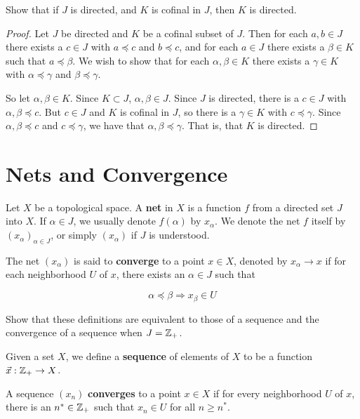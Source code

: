 \documentclass[12pt]{article}
\begin{document}
Show that if $J$ is directed, and $K$ is cofinal in $J$, then $K$ is directed.

\begin{proof}
    Let $J$ be directed and $K$ be a cofinal subset of $J$. Then for each $a, b \in J$
    there exists a $c \in J$ with $a \preceq c$ and $b \preceq c$, and for each
    $a \in J$ there exists a $\beta \in K$ such that $a \preceq \beta$. We wish
    to show that for each $\alpha, \beta \in K$ there exists a $\gamma \in K$ with
    $\alpha \preceq \gamma$ and $\beta \preceq \gamma$.

    So let $\alpha, \beta \in K$. Since $K \subset J$, $\alpha, \beta \in J$. Since $J$ is
    directed, there is a $c \in J$ with $\alpha, \beta \preceq c$. But $c \in J$ and $K$ is cofinal
    in
    $J$, so there is a $\gamma \in K$ with $c \preceq \gamma$. Since $\alpha, \beta \preceq c$ and
    $c \preceq \gamma$, we have that $\alpha, \beta \preceq \gamma$. That is, that $K$ is directed.
\end{proof}

\section{Nets and Convergence}
\begin{defn}
    Let $X$ be a topological space. A \textbf{net} in $X$ is a function $f$ from a directed set $J$
    into $X$. If $\alpha \in J$, we usually denote $f(\alpha)$ by $x_\alpha$. We denote the net $f$
    itself by ${\left(x_\alpha\right)}_{\alpha \in J}$, or simply $(x_\alpha)$ if $J$ is
    understood.
\end{defn}
\begin{defn}
    The net $(x_\alpha)$ is said to \textbf{converge} to a point $x \in X$, denoted by $x_\alpha
        \to x$ if for each neighborhood $U$ of $x$, there exists an $\alpha \in J$ such that

    \[\alpha \preceq \beta \Longrightarrow x_\beta \in U\]
\end{defn}

Show that these definitions are equivalent to those of a sequence and the convergence of a sequence
when $J = \mathbb{Z}_+$.

\begin{defn}
    Given a set $X$, we define a \textbf{sequence} of elements of $X$ to be a function $\vec x :
        \mathbb{Z}_+ \to X$.
\end{defn}

\begin{defn}
    A sequence $(x_n)$ \textbf{converges} to a point $x \in X$ if for every neighborhood $U$ of
    $x$, there is an $n^* \in \mathbb {\mathbb{Z}}_+$ such that $x_n \in U$ for all $n \geq n^*$.
\end{defn}
\end{document}
